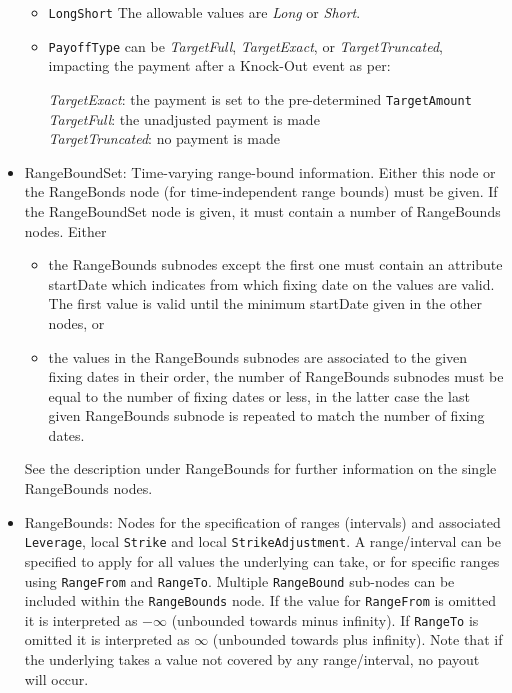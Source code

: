 \begin{itemize}
\begin{itemize}
\item \lstinline!LongShort! The allowable values are \emph{Long} or \emph{Short}.
\item \lstinline!PayoffType! can be \emph{TargetFull}, \emph{TargetExact}, or \emph{TargetTruncated}, impacting the payment after a Knock-Out event as per:
      
     \emph{TargetExact}: the payment is set to the pre-determined \lstinline!TargetAmount!\\
     \emph{TargetFull}: the unadjusted payment is made\\
     \emph{TargetTruncated}: no payment is made
\end{itemize}

    \item RangeBoundSet: Time-varying range-bound information. Either this node or the RangeBonds node (for time-independent range bounds) must be given. If the RangeBoundSet node is given, it must contain a number of RangeBounds nodes. Either
     \begin{itemize}
       \item the RangeBounds subnodes except the first one must contain an attribute startDate which indicates from
         which fixing date on the values are valid. The first value is valid until the minimum startDate given in the
         other nodes, or
       \item the values in the RangeBounds subnodes are associated to the given fixing dates in their order, the number
         of RangeBounds subnodes must be equal to the number of fixing dates or less, in the latter case the last given
         RangeBounds subnode is repeated to match the number of fixing dates.
     \end{itemize}
     See the description under RangeBounds for further information on the single RangeBounds nodes.

    \item RangeBounds: Nodes for the specification of ranges (intervals) and associated \lstinline!Leverage!, local
      \lstinline!Strike! and local \lstinline!StrikeAdjustment!. A range/interval can be specified to apply for all
      values the underlying can take, or for specific ranges using \lstinline!RangeFrom! and
      \lstinline!RangeTo!. Multiple \lstinline!RangeBound! sub-nodes can be included within the \lstinline!RangeBounds!
      node. If the value for \lstinline!RangeFrom! is omitted it is interpreted as $-\infty$ (unbounded towards minus
      infinity). If \lstinline!RangeTo! is omitted it is interpreted as $\infty$ (unbounded towards plus infinity).
      Note that if the underlying takes a value not covered by any range/interval, no payout will occur.
    

\end{itemize}
